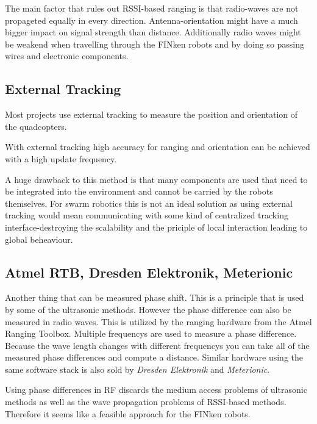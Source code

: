 The main factor that rules out RSSI-based ranging is that radio-waves are not propageted equally in every direction. 
Antenna-orientation might have a much bigger impact on signal strength than distance.
Additionally radio waves might be weakend when travelling through the FINken robots and by doing so passing wires and electronic components.

\subsection{External Tracking}

Most projects use external tracking to measure the position and orientation of the quadcopters. 

With external tracking high accuracy for ranging and orientation can be achieved with a high update frequency.


A huge drawback to this method is that many components are used that need to be integrated into the environment and cannot be carried by the robots themselves.
For swarm robotics this is not an ideal solution as using external tracking would mean communicating with some kind of centralized tracking interface-destroying the scalability and the priciple of local interaction leading to global beheaviour.
\subsection{Atmel RTB, Dresden Elektronik, Meterionic}

Another thing that can be measured phase shift.
This is a principle that is used by some of the ultrasonic methods.
However the phase difference can also be measured in radio waves.
This is utilized by the ranging hardware from the Atmel Ranging Toolbox.
Multiple frequencys are used to measure a phase difference.
Because the wave length changes with different frequencys you can take all of the measured phase differences and compute a distance.
Similar hardware using the same software stack is also sold by \emph{Dresden Elektronik} and \emph{Meterionic}.

Using phase differences in RF discards the medium access problems of ultrasonic methods as well as the wave propagation problems of RSSI-based methods.
Therefore it seems like a feasible approach for the FINken robots.

